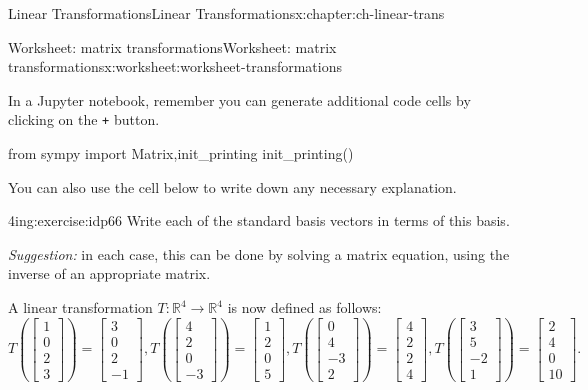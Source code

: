 \documentclass[oneside,10pt,]{book}
\newcommand{\mono}[1]{\texttt{#1}}
\numberwithin{equation}{section}
\newcommand{\R}{\mathbb{R}}
\begin{document}
\begin{chapterptx}{Linear Transformations}{}{Linear Transformations}{}{}{x:chapter:ch-linear-trans}
\begin{worksheet-section}{Worksheet: matrix transformations}{}{Worksheet: matrix transformations}{}{}{x:worksheet:worksheet-transformations}
\par
In a Jupyter notebook, remember you can generate additional code cells by clicking on the \mono{+} button.%
\begin{sageinput}
from sympy import Matrix,init_printing
init_printing()
\end{sageinput}
You can also use the cell below to write down any necessary explanation.%
\begin{divisionexercise}{2}{}{4in}{g:exercise:idp66}%
Write each of the standard basis vectors in terms of this basis.%
\par
\emph{Suggestion:} in each case, this can be done by solving a matrix equation, using the inverse of an appropriate matrix.%
\end{divisionexercise}%
\clearpage
A linear transformation \(T:\R^4\to \R^4\) is now defined as follows:%
\begin{equation*}
T\left(\begin{bmatrix}1\\0\\2\\3\end{bmatrix}\right)=\begin{bmatrix}3\\0\\2\\-1\end{bmatrix},
T\left(\begin{bmatrix}4\\2\\0\\-3\end{bmatrix}\right)=\begin{bmatrix}1\\2\\0\\5\end{bmatrix},
T\left(\begin{bmatrix}0\\4\\-3\\2\end{bmatrix}\right)=\begin{bmatrix}4\\2\\2\\4\end{bmatrix},
T\left(\begin{bmatrix}3\\5\\-2\\1\end{bmatrix}\right)=\begin{bmatrix}2\\4\\0\\10\end{bmatrix}\text{.}

\end{equation*}
\end{worksheet-section}
\end{chapterptx}
\end{document}
